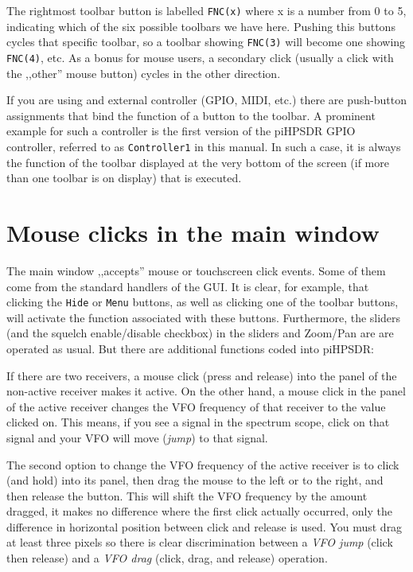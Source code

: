 \documentclass[12pt]{book}
\def\rett#1{\texttt{\color{red}#1}}
\def\pH{pi\-HPSDR\xspace}
\begin{document}
The rightmost toolbar button is labelled \texttt{FNC(x)} where
x is a number from 0 to 5, indicating which of the six possible
toolbars we have here. Pushing this buttons cycles that specific
toolbar, so a toolbar showing \texttt{FNC(3)} will become one
showing \texttt{FNC(4)}, etc. As a bonus for mouse users,
a secondary click (usually a click with the ,,other'' mouse
button) cycles in the other direction.

If you are using and external controller (GPIO, MIDI, etc.) there
are push-button assignments that bind the function of a button
to the toolbar. A prominent example for such a controller
is the first version of the \pH GPIO controller, referred to
as \texttt{Controller1} in this manual.
In such a case, it is always the function of the
toolbar displayed at the very bottom of the screen (if more than
one toolbar is on display) that is executed.


\section{Mouse clicks in the main window}
The main window ,,accepts'' mouse or touchscreen click events.
Some of them come from the standard handlers of the GUI. It is
clear, for example, that clicking the \rett{Hide} or
\rett{Menu} buttons, as well as clicking one of the
toolbar buttons, will activate the function associated with
these buttons. Furthermore, the sliders (and the squelch enable/disable
checkbox) in the sliders and Zoom/Pan are are operated as usual.
But there are additional functions coded into \pH:

If there are two receivers, a mouse click (press and release) into
the panel of the non-active receiver makes it active. On the other
hand, a mouse click in the panel of the active receiver changes
the VFO frequency of that receiver to the value clicked on.
This means, if you see a signal in the spectrum scope, click
on that signal and your VFO will move (\textit{jump}) to that signal.

The second option to change the VFO frequency of the active receiver
is to click (and hold) into its panel, then drag the mouse to the left
or to the right, and then release the button. This will shift the
VFO frequency by the amount dragged, it makes no difference
where the first click actually occurred, only the difference
in horizontal position between click and release is used. You must
drag at least three pixels so there is clear discrimination between
a \textit{VFO jump} (click then release) and a \textit{VFO drag} (click, drag,
and release) operation.
\end{document}
